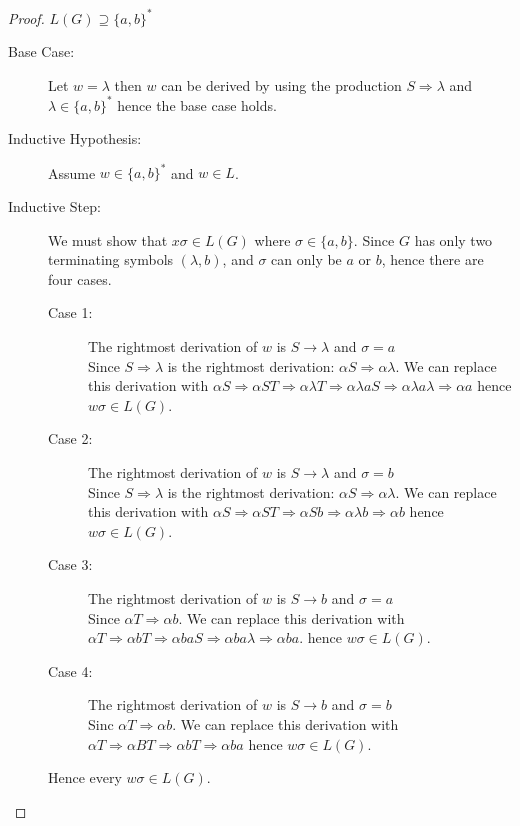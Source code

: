\documentclass{article}
\begin{document}
\begin{description}
  \begin{proof}  $L(G) \supseteq \{a,b\}^*$\\
    \begin{description}
    \item[Base Case:]
      Let $w = \lambda$ then $w$ can be derived by using the production $S \Rightarrow \lambda$ and $\lambda \in \{a,b\}^*$ hence the base case holds.
    \item[Inductive Hypothesis:]
      Assume $w \in \{a,b\}^*$ and $w \in L$. 
    \item[Inductive Step:]
      We must show that $x\sigma \in L(G)$ where $\sigma \in \{a,b\}$.
      Since $G$ has only two terminating symbols $(\lambda, b)$, and $\sigma$ can only be $a$ or $b$, hence there are four cases.
      \begin{description}
      \item[Case 1:]
        The rightmost derivation of $w$ is $S \rightarrow \lambda$ and $\sigma = a$\\
        Since $S \Rightarrow \lambda$ is the rightmost derivation: $\alpha S \Rightarrow \alpha\lambda$. We can replace this derivation with $\alpha S \Rightarrow \alpha ST \Rightarrow\alpha\lambda T \Rightarrow\alpha\lambda aS \Rightarrow\alpha\lambda a \lambda \Rightarrow \alpha a$ hence $w\sigma \in L(G)$.
      \item[Case 2:]
        The rightmost derivation of $w$ is $S \rightarrow \lambda$ and $\sigma = b$\\
        Since $S \Rightarrow \lambda$ is the rightmost derivation: $\alpha S \Rightarrow \alpha\lambda$. We can replace this derivation with $\alpha S \Rightarrow \alpha ST \Rightarrow \alpha Sb \Rightarrow \alpha \lambda b \Rightarrow \alpha b$ hence $w\sigma \in L(G)$.
      \item[Case 3:]
        The rightmost derivation of $w$ is $S \rightarrow b$ and $\sigma = a$\\
        Since $\alpha T \Rightarrow \alpha b$. We can replace this derivation with $\alpha T \Rightarrow \alpha bT \Rightarrow \alpha baS \Rightarrow \alpha ba\lambda \Rightarrow \alpha ba$. hence $w\sigma \in L(G)$.
      \item[Case 4:]
        The rightmost derivation of $w$ is $S \rightarrow b$ and $\sigma = b$\\
        Sinc $\alpha T \Rightarrow \alpha b$. We can replace this derivation with $\alpha T \Rightarrow \alpha BT \Rightarrow \alpha bT \Rightarrow \alpha ba$ hence $w\sigma \in L(G)$.
      \end{description}
      Hence every $w\sigma \in L(G)$.


\end{description}
\end{proof}
\end{description}
\end{document}

